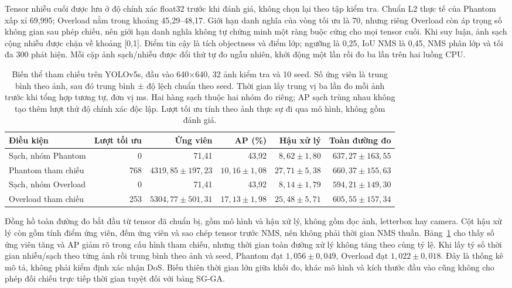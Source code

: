 \documentclass[a4paper,fleqn]{cas-dc}
\begin{document}
Tensor nhiễu cuối được lưu ở độ chính xác float32 trước khi đánh giá, không chọn lại theo tập kiểm tra. Chuẩn L2 thực tế của Phantom xấp xỉ 69,995; Overload nằm trong khoảng 45,29--48,17. Giới hạn danh nghĩa của vòng tối ưu là 70, nhưng riêng Overload còn áp trọng số không gian sau phép chiếu, nên giới hạn danh nghĩa không tự chứng minh một ràng buộc cứng cho mọi tensor cuối. Khi suy luận, ảnh sạch cộng nhiễu được chặn về khoảng [0,1]. Điểm tin cậy là tích objectness và điểm lớp; ngưỡng là 0,25, IoU NMS là 0,45, NMS phân lớp và tối đa 300 phát hiện. Mỗi cặp ảnh sạch/nhiễu được đổi thứ tự đo ngẫu nhiên, khởi động một lần rồi đo ba lần trên hai luồng CPU.

\begin{table}[t]
\centering
\small
\caption{Biến thể tham chiếu trên YOLOv5s, đầu vào 640×640, 32 ảnh kiểm tra và 10 seed. Số ứng viên là trung bình theo ảnh, sau đó trung bình ± độ lệch chuẩn theo seed. Thời gian lấy trung vị ba lần đo mỗi ảnh trước khi tổng hợp tương tự, đơn vị ms. Hai hàng sạch thuộc hai nhóm đo riêng; AP sạch trùng nhau không tạo thêm lượt thử độ chính xác độc lập. Lượt tối ưu tính theo ảnh thực sự đi qua mô hình, không gồm đánh giá.}
\begin{tabularx}{\textwidth}{Xrrrrr}
\toprule
Điều kiện & Lượt tối ưu & Ứng viên & AP (\%) & Hậu xử lý & Toàn đường đo \\
\midrule
Sạch, nhóm Phantom & 0 & 71,41 & 43,92 & $8{,}62\pm1{,}80$ & $637{,}27\pm163{,}55$ \\
Phantom tham chiếu & 768 & $4319{,}85\pm197{,}23$ & $10{,}16\pm1{,}08$ & $27{,}71\pm5{,}38$ & $660{,}37\pm155{,}63$ \\
Sạch, nhóm Overload & 0 & 71,41 & 43,92 & $8{,}14\pm1{,}79$ & $594{,}21\pm149{,}30$ \\
Overload tham chiếu & 253 & $5304{,}77\pm501{,}31$ & $17{,}13\pm1{,}98$ & $25{,}48\pm5{,}71$ & $605{,}55\pm157{,}34$ \\
\bottomrule
\end{tabularx}
\label{tab:extended_reference}
\end{table}

Đồng hồ toàn đường đo bắt đầu từ tensor đã chuẩn bị, gồm mô hình và hậu xử lý, không gồm đọc ảnh, letterbox hay camera. Cột hậu xử lý còn gồm tính điểm ứng viên, đếm ứng viên và sao chép tensor trước NMS, nên không phải thời gian NMS thuần. Bảng~\ref{tab:extended_reference} cho thấy số ứng viên tăng và AP giảm rõ trong cấu hình tham chiếu, nhưng thời gian toàn đường xử lý không tăng theo cùng tỷ lệ. Khi lấy tỷ số thời gian nhiễu/sạch theo từng ảnh rồi trung bình theo ảnh và seed, Phantom đạt $1{,}056\pm0{,}049$, Overload đạt $1{,}022\pm0{,}018$. Đây là thống kê mô tả, không phải kiểm định xác nhận DoS. Biến thiên thời gian lớn giữa khối đo, khác mô hình và kích thước đầu vào cũng không cho phép đối chiếu trực tiếp thời gian tuyệt đối với bảng SG-GA.
\end{document}
